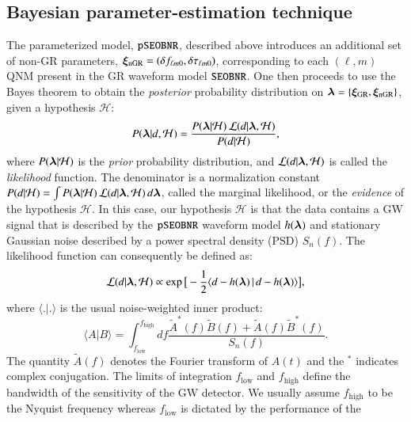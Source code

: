 \subsection{Bayesian parameter-estimation technique}
\label{sec:method}

The parameterized model, $\texttt{pSEOBNR}$, described above introduces an additional set of non-GR parameters, $\bm{\xi}_{\text{nGR}} = (\delta f_{\ell m 0},\delta \tau_{\ell m 0})$, corresponding to each $(\ell,m)$ QNM present in the GR waveform model $\texttt{SEOBNR}$. One then proceeds to use the Bayes theorem to obtain the \emph{posterior} probability distribution on $\bm{\lambda} = \{\bm{\xi}_{\text{GR}}, \bm{\xi}_{\text{nGR}}\}$, given a hypothesis $\mathcal{H}$:
%
\begin{equation}
P(\bm{\lambda} | d, \mathcal{H}) = \frac{P(\bm{\lambda} | \mathcal{H}) \, \mathcal{L}(d | \bm{\lambda}, \mathcal{H})}{P(d|\mathcal{H})},
\label{eq:Bayes_theorem}
\end{equation}
%
where $P(\bm{\lambda} | \mathcal{H})$ is the \emph{prior} probability distribution, and $\mathcal{L}(d | \bm{\lambda}, \mathcal{H})$ is called the \emph{likelihood} function. The denominator is a normalization constant $P(d|\mathcal{H}) = \int P(\bm{\lambda} | \mathcal{H}) \, \mathcal{L}(d | \bm{\lambda}, \mathcal{H}) \, d\bm{\lambda}$, called the marginal likelihood, or the \emph{evidence} of the hypothesis $\mathcal{H}$. In this case, our hypothesis $\mathcal{H}$ is that the data contains a GW signal that is described by the $\texttt{pSEOBNR}$ waveform model $h(\bm{\lambda})$  and stationary Gaussian noise described by a power spectral density (PSD) $S_n(f)$. The likelihood function can consequently be defined as:
%
\begin{equation}
\mathcal{L}(d | \bm{\lambda}, \mathcal{H}) \propto \exp\big[-\frac{1}{2} \langle d - h(\bm{\lambda}) \, | \, d -h(\bm{\lambda}) \rangle \big],
\label{eq:likelihood}
\end{equation}
%
where $\langle . | . \rangle$ is the usual noise-weighted inner product:
%
\begin{equation}
\langle A | B \rangle = \int_{f_\mathrm{low}} ^{f_\mathrm{high}} df \frac{\tilde{A}^*(f)\tilde{B}(f) + \tilde{A}(f)\tilde{B}^*(f)}{S_n(f)}.
\label{eq:nwip}
\end{equation}
%
The quantity $\tilde{A}(f)$ denotes the Fourier transform of $A(t)$ and the $^*$ indicates complex conjugation. The limits of integration ${f_\mathrm{low}}$ and ${f_\mathrm{high}}$ define the bandwidth of the sensitivity of the GW detector. We usually assume ${f_\mathrm{high}}$ to be the Nyquist frequency whereas ${f_\mathrm{low}}$ is dictated by the performance of the
